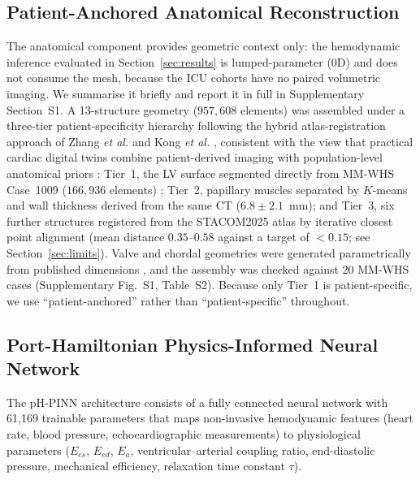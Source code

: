 \documentclass[journal]{IEEEtran}
\begin{document}
\subsection{Patient-Anchored Anatomical Reconstruction}\label{sec:anat}
The anatomical component provides geometric context only: the hemodynamic inference evaluated in Section~\ref{sec:results} is lumped-parameter (0D) and does not consume the mesh, because the ICU cohorts have no paired volumetric imaging. We summarise it briefly and report it in full in Supplementary Section~S1. A 13-structure geometry ($957{,}608$ elements) was assembled under a three-tier patient-specificity hierarchy following the hybrid atlas-registration approach of Zhang \emph{et al.} \cite{zhang2012} and Kong \emph{et al.} \cite{kong2023}, consistent with the view that practical cardiac digital twins combine patient-derived imaging with population-level anatomical priors \cite{corral2020,rodero2021,hoogendoorn2013}: Tier~1, the LV surface segmented directly from MM-WHS Case~1009 ($166{,}936$ elements) \cite{zhuang2019}; Tier~2, papillary muscles separated by $K$-means and wall thickness derived from the same CT ($6.8\pm2.1$~mm); and Tier~3, six further structures registered from the STACOM2025 atlas by iterative closest point alignment (mean distance $0.35$--$0.58$ against a target of $<0.15$; see Section~\ref{sec:limits}). Valve and chordal geometries were generated parametrically from published dimensions \cite{kunzelman1994,thubrikar1981,lam1970}, and the assembly was checked against 20 MM-WHS cases (Supplementary Fig.~S1, Table~S2). Because only Tier~1 is patient-specific, we use ``patient-anchored'' rather than ``patient-specific'' throughout.

\subsection{Port-Hamiltonian Physics-Informed Neural Network}\label{sec:pinn}
The pH-PINN architecture consists of a fully connected neural network with 61{,}169 trainable parameters that maps non-invasive hemodynamic features (heart rate, blood pressure, echocardiographic measurements) to physiological parameters ($E_{es}$, $E_{ed}$, $E_a$, ventricular--arterial coupling ratio, end-diastolic pressure, mechanical efficiency, relaxation time constant $\tau$).
\end{document}
